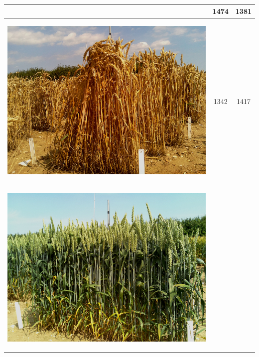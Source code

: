 \begin{table}[ht!]
\begin{tabular}{ | c | c | c | }
\begin{minipage}{.3\textwidth}
\begin{center}
      \end{center}
    \end{minipage}
    &
      1474
    & 
      1381
    \\ \hline
    \begin{minipage}{.3\textwidth}
      \begin{center}
		\includegraphics[width=\linewidth]{Images/011}
      \end{center}
    \end{minipage}
    &
      1342
    & 
      1417
    \\ \hline
    \begin{minipage}{.3\textwidth}
      \begin{center}
		\includegraphics[width=\linewidth]{Images/012}

\end{center}
\end{minipage}
\end{tabular}
\end{table}
